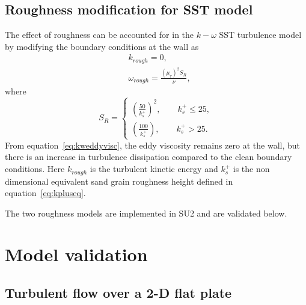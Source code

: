 \subsection{Roughness modification for SST model}
The effect of roughness can be accounted for in the $k-\omega$ SST turbulence model by modifying the boundary conditions at the wall as~\cite{wilcox2006turbulence}
\begin{eqnarray}
& k_{rough} = 0, \\
& \omega_{rough} = \frac{(\mu_{\tau})^2 S_R}{\nu},
\end{eqnarray}{}
where
\begin{equation*}
    S_R = \begin{cases}{}
    (\frac{50}{k_s^+})^2, \qquad k_s^+ \leq 25,\\
    (\frac{100}{k_s^+}), \qquad k_s^+ > 25.
    \end{cases}
\end{equation*}{}
From equation~\ref{eq:kweddyvisc}, the eddy viscosity remains zero at the wall, but there is an increase in turbulence dissipation compared to the clean boundary conditions. Here $k_{rough}$ is the turbulent kinetic energy and $k_s^+$ is the non dimensional equivalent sand grain roughness height defined in equation~\ref{eq:kpluseq}.

The two roughness models are implemented in SU2 and are validated below.
\section{Model validation}\label{sec:fpvalid}
\subsection{Turbulent flow over a 2-D flat plate}
